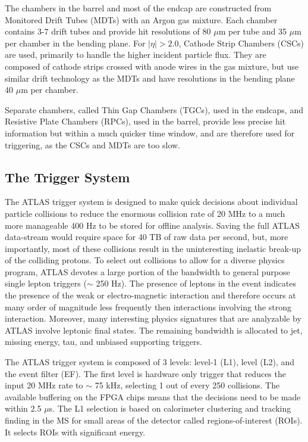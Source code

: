 The chambers in the barrel and most of the endcap are constructed from Monitored Drift Tubes (MDTs) with an Argon gas mixture. Each chamber contains 3-7 drift tubes and provide hit resolutions of 80 $\mu$m per tube and 35 $\mu$m per chamber in the bending plane. For $|\eta| > 2.0$, Cathode Strip Chambers (CSCs) are used, primarily to handle the higher incident particle flux. They are composed of cathode strips crossed with anode wires in the gas mixture, but use similar drift technology as the MDTs and have resolutions in the bending plane 40 $\mu$m per chamber. 

Separate chambers, called Thin Gap Chambers (TGCs), used in the endcaps, and Resistive Plate Chambers (RPCs), used in the barrel, provide less precise hit information but within a much quicker time window, and are therefore used for triggering, as the CSCs and MDTs are too slow.


\subsection{The Trigger System} 


The ATLAS trigger system is designed to make quick decisions about individual particle collisions to reduce the enormous collision rate of 20 MHz to a much more manageable 400 Hz to be stored for offline analysis. Saving the full ATLAS data-stream would require space for 40 TB of raw data per second, but, more importantly, most of these collisions result in the uninteresting inelastic break-up of the colliding protons. To select out collisions to allow for a diverse physics program, ATLAS devotes a large portion of the bandwidth to general purpose single lepton triggers ($\sim$ 250 Hz). The presence of leptons in the event indicates the presence of the weak or electro-magnetic interaction and therefore occurs at many order of magnitude less frequently then interactions involving the strong interaction. Moreover, many interesting physics signatures that are analyzable by ATLAS involve leptonic final states. The remaining bandwidth is allocated to jet, missing energy, tau, and unbiased supporting triggers.

The ATLAS trigger system is composed of 3 levels: level-1 (L1), level (L2), and the event filter (EF). The first level is hardware only trigger that reduces the input 20 MHz rate to $\sim$ 75 kHz, selecting 1 out of every 250 collisions. The available buffering on the FPGA chips means that the decisions need to be made within 2.5 $\mu$s. The L1 selection is based on calorimeter clustering and tracking finding in the MS for small areas of the detector called regions-of-interest (ROIs). It selects ROIs with significant energy.  

